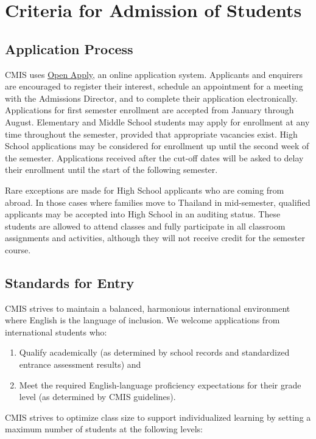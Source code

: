 \section{Criteria for Admission of Students}

\subsection{Application Process}

CMIS uses \href{https://cmis.openapply.com/}{Open Apply}, an online application system.  Applicants and enquirers are encouraged to register their interest, schedule an appointment for a meeting with the Admissions Director, and to complete their application electronically.  Applications for first semester enrollment are accepted from January through August.  Elementary and Middle School students may apply for enrollment at any time throughout the semester, provided that appropriate vacancies exist.  High School applications may be considered for enrollment up until the second week of the semester.  Applications received after the cut-off dates will be asked to delay their enrollment until the start of the following semester.  

Rare exceptions are made for High School applicants who are coming from abroad.  In those cases where families move to Thailand in mid-semester, qualified applicants may be accepted into High School in an auditing status.  These students are allowed to attend classes and fully participate in all classroom assignments and activities, although they will not receive credit for the semester course.  

\subsection{Standards for Entry}

CMIS strives to maintain a balanced, harmonious international environment where English is the language of inclusion.  We welcome applications from international students who:
\begin{enumerate}
\item Qualify academically (as determined by school records and standardized entrance assessment results) and
\item Meet the required English-language proficiency expectations for their grade level (as determined by CMIS guidelines).  
\end{enumerate}
CMIS strives to optimize class size to support individualized learning by setting a maximum number of students at the following levels:  

